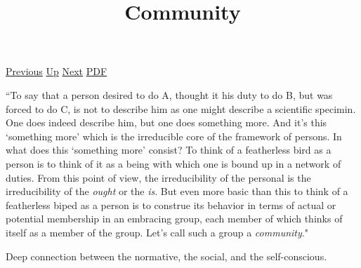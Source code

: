 \documentclass[12pt,a4paper]{report}
\begin{document}
 \href{doc/phil/People/Sellars/Quotes/Againstphenomenalism.html}{Previous} 
 \href{doc/phil/People/Sellars/Quotes.html}{Up} 
 \href{doc/phil/People/Sellars/Quotes/Describingandexplaining.html}{Next} 
 \href{doc/phil/People/Sellars/Quotes/Community.pdf}{PDF} 
\title{Community}
``To say that a person desired to do A, thought it his duty to do B, but was forced to do C, is not to describe him as one might describe a scientific specimin. One does indeed describe him, but one does something more. And it's this `something more' which is the irreducible core of the framework of persons. In what does this `something more' consist? To think of a featherless bird as a person is to think of it as a being with which  one is bound up in a network of duties. From this point of view, the irreducibility of the personal is the irreducibility of the \emph{ought} or the \emph{is}. But even more basic than this to think of a featherless biped as a person is to construe its behavior in terms of actual or potential membership in an embracing group, each member of which thinks of itself as a member of the group. Let's call such a group a \emph{community}."

Deep connection between the normative, the social, and the self-conscious.
\end{document}
